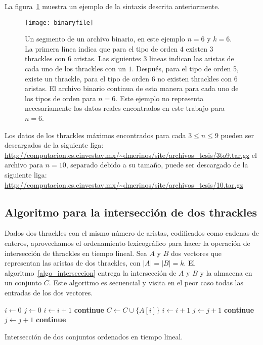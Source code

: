   La figura~\ref{fig:binaryfile} muestra un ejemplo de la sintaxis
  descrita anteriormente.
  \begin{figure}[htpb]
    \centering
    \texttt{[image: binaryfile]}
    \caption{Un segmento de un archivo binario, en este ejemplo $n=6$ y $k=6$.
    La primera línea indica que para el tipo de orden $4$ existen $3$ thrackles
    con $6$ aristas. Las siguientes 3 lineas indican las aristas de cada uno
    de los thrackles con un $1$. Después, para el tipo de orden 5, existe un
    thrackle, para el tipo de orden 6 no existen thrackles con 6 aristas. El
    archivo binario continua de esta manera para cada uno de los tipos de orden
    para $n=6$. Este ejemplo no representa necesariamente los datos reales
    encontrados en este trabajo para $n=6$.}
    \label{fig:binaryfile}
  \end{figure}

  Los datos de los thrackles máximos encontrados para cada $ 3\leq n \leq 9$
  pueden ser descargados de la siguiente liga:
  \url{http://computacion.cs.cinvestav.mx/~dmerinos/site/archivos_tesis/3to9.tar.gz}
  el archivo para $n=10$, separado debido a su tamaño,
   puede ser descargado de la siguiente liga:
  \url{http://computacion.cs.cinvestav.mx/~dmerinos/site/archivos_tesis/10.tar.gz}

\subsection{Algoritmo para la intersección de dos thrackles}
  Dados dos thrackles con el mismo número de aristas, codificados como cadenas
  de enteros, aprovechamos el ordenamiento lexicográfico para hacer la
  operación de intersección de thrackles en tiempo lineal.
  Sea $A$ y $B$ dos vectores que representan las aristas de dos thrackles, con
  $|A|=|B|=k$. El algoritmo~\ref{algo_interseccion} entrega la intersección de $A$ y $B$ y la almacena en un conjunto $C$. Este algoritmo es secuencial y visita en el peor caso todas las entradas de los dos vectores.
  \begin{algorithm}[htpb]
    \begin{algorithmic}[1]
      \State $i\gets 0$
      \State $j\gets 0$
          \State $i\gets i+1$
          \State \textbf{continue}
        \EndIf
          \State $C\gets C\cup \{A[i]\}$
          \State $i\gets i+1$
          \State $j\gets j+1$
          \State \textbf{continue}
        \EndIf
          \State $j\gets j+1$
          \State \textbf{continue}
        \EndIf
      \EndWhile
      \EndProcedure
    \end{algorithmic}
    \caption{Intersección de dos conjuntos ordenados en tiempo lineal.}
    \label{algo_interseccion}
  \end{algorithm}

